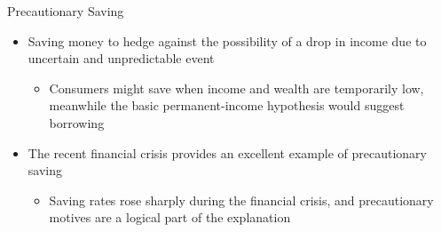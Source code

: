 \documentclass[aspectratio=1610]{beamer}
\begin{document}
\begin{frame}[wide]{Precautionary Saving}
	\begin{itemize}
		\item Saving money to hedge against the possibility of a drop in income due to uncertain and unpredictable event
		\begin{itemize}
			\item Consumers might save when income and wealth are temporarily low, meanwhile the basic permanent-income hypothesis would suggest borrowing
		\end{itemize}
		\item The recent financial crisis provides an excellent example of precautionary saving
		\begin{itemize}
			\item Saving rates rose sharply during the financial crisis, and precautionary motives are a logical part of the explanation
		\end{itemize}
	\end{itemize}
\end{frame}




\end{document}
